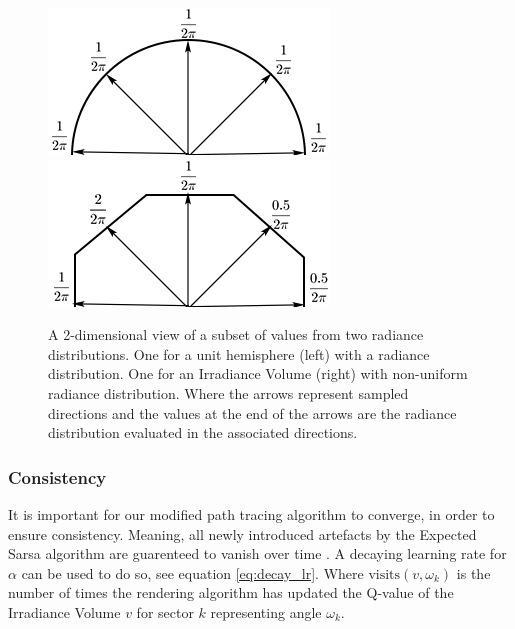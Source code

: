 \documentclass[../dissertation.tex]{subfiles}
\begin{document}
\begin{figure}[h]
\centering
{}
  \includegraphics[width=\textwidth]{images/uniform_pdf.png}   
  \label{fig:uniform_pdf}
\endminipage\hspace{5em}
  \includegraphics[width=\textwidth]{images/not_uniform_pdf.png}
  \label{fig:not_uniform_pdf}
\endminipage
\caption{A 2-dimensional view of a subset of values from two radiance distributions. One for a unit hemisphere (left) with a radiance distribution. One for an Irradiance Volume (right) with non-uniform radiance distribution. Where the arrows represent sampled directions and the values at the end of the arrows are the radiance distribution evaluated in the associated directions.}
\label{fig:pdfs}
\end{figure}

\subsubsection*{Consistency}
It is important for our modified path tracing algorithm to converge, in order to ensure consistency. Meaning, all newly introduced artefacts by the Expected Sarsa algorithm are guarenteed to vanish over time \cite{dahm2017learning}. A decaying learning rate for $\alpha$ can be used to do so, see equation \ref{eq:decay_lr}. Where $\text{visits}(v, \omega_k)$ is the number of times the rendering algorithm has updated the Q-value of the Irradiance Volume $v$ for sector $k$ representing angle $\omega_k$.
\end{document}
